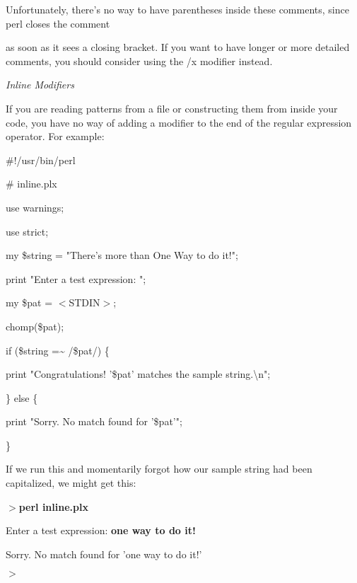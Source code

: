 \documentclass[a4paper,11pt]{book}
\begin{document}
\noindent Unfortunately, there's no way to have parentheses inside these comments, since perl closes the comment

\noindent as soon as it sees a closing bracket. If you want to have longer or more detailed comments, you should consider using the /x modifier instead.

\noindent 

\noindent \textit{Inline Modifiers}

\noindent If you are reading patterns from a file or constructing them from inside your code, you have no way of adding a modifier to the end of the regular expression operator. For example:

\noindent 

\noindent \#!/usr/bin/perl

\noindent \# inline.plx

\noindent use warnings;

\noindent use strict;

\noindent 

\noindent my \$string = "There's more than One Way to do it!";

\noindent 

\noindent print "Enter a test expression: ";

\noindent my \$pat = $<$STDIN$>$;

\noindent chomp(\$pat);

\noindent 

\noindent if (\$string =\~{} /\$pat/) \{

\noindent print "Congratulations! '\$pat' matches the sample string.\textbackslash n";

\noindent \} else \{

\noindent print "Sorry. No match found for '\$pat'";

\noindent \}

\noindent 

\noindent 

\noindent If we run this and momentarily forgot how our sample string had been capitalized, we might get this:

\noindent 

\noindent $>$\textbf{perl inline.plx}

\noindent Enter a test expression: \textbf{one way to do it!}

\noindent Sorry. No match found for 'one way to do it!'

\noindent $>$

\noindent 
\end{document}
